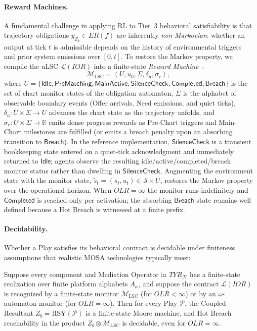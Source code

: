 \paragraph{Reward Machines.}
A fundamental challenge in applying RL to Tier~3 behavioral satisfiability is that trajectory obligations $y_{Z_b} \in ER(f)$ are inherently \emph{non-Markovian}: whether an output at tick $t$ is admissible depends on the history of environmental triggers and prior system emissions over $[0, t]$.  To restore the Markov property, we compile the uLSC $\mathcal{L}(IOR)$ into a finite-state \emph{Reward Machine}~\cite{ToroIcarte2022}:
\begin{equation}
    \mathcal{M}_{\text{LSC}} = (U, u_0, \Sigma, \delta_u, \sigma_r),
    \label{eq:reward-machine}
\end{equation}
where $U = \{\mathsf{Idle}, \mathsf{PreMatching}, \mathsf{MainActive}, \mathsf{SilenceCheck}, \mathsf{Completed}, \mathsf{Breach}\}$ is the set of chart monitor states of the obligation automaton, $\Sigma$ is the alphabet of observable boundary events (Offer arrivals, Need emissions, and quiet ticks), $\delta_u : U \times \Sigma \to U$ advances the chart state as the trajectory unfolds, and $\sigma_r : U \times \Sigma \to \mathbb{R}$ emits dense progress rewards as Pre-Chart triggers and Main-Chart milestones are fulfilled (or emits a breach penalty upon an absorbing transition to $\mathsf{Breach}$).  In the reference implementation, $\mathsf{SilenceCheck}$ is a transient bookkeeping state entered on a quiet-tick acknowledgment and immediately returned to $\mathsf{Idle}$; agents observe the resulting idle/active/completed/breach monitor status rather than dwelling in $\mathsf{SilenceCheck}$.  Augmenting the environment state with the monitor state, $\tilde{s}_t = (s_t, u_t) \in \mathcal{S} \times U$, restores the Markov property over the operational horizon.  When $OLR = \infty$ the monitor runs indefinitely and $\mathsf{Completed}$ is reached only per activation; the absorbing $\mathsf{Breach}$ state remains well defined because a Hot Breach is witnessed at a finite prefix.

\paragraph{Decidability.}
Whether a Play satisfies its behavioral contract is decidable under finiteness assumptions that realistic MOSA technologies typically meet:

\begin{proposition} \label{prop:finite-decidable}
Suppose every component and Mediation Operator in $TYR_{\mathcal{K}}$ has a finite-state realization over finite platform alphabets $A_{\kappa}$, and suppose the contract $\mathcal{L}(IOR)$ is recognized by a finite-state monitor $\mathcal{M}_{\text{LSC}}$ (for $OLR < \infty$) or by an $\omega$-automaton monitor (for $OLR = \infty$).  Then for every Play $\mathcal{P}$, the Coupled Resultant $Z_b = \mathrm{RSY}(\mathcal{P})$ is a finite-state Moore machine, and Hot Breach reachability in the product $Z_b \otimes \mathcal{M}_{\text{LSC}}$ is decidable, even for $OLR = \infty$.
\end{proposition}

